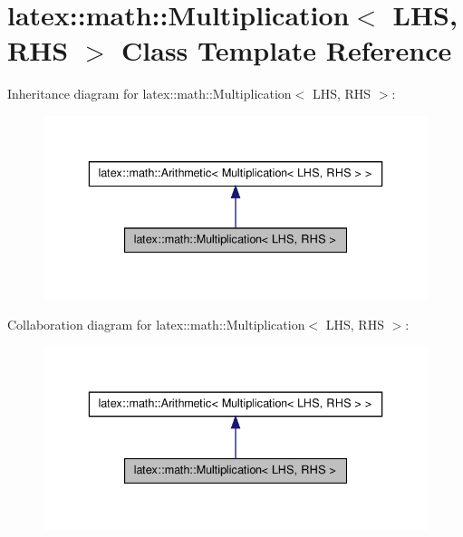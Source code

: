 \hypertarget{classlatex_1_1math_1_1Multiplication}{\section{latex\-:\-:math\-:\-:\-Multiplication$<$ \-L\-H\-S, \-R\-H\-S $>$ \-Class \-Template \-Reference}
\label{classlatex_1_1math_1_1Multiplication}
}


\-Inheritance diagram for latex\-:\-:math\-:\-:\-Multiplication$<$ \-L\-H\-S, \-R\-H\-S $>$\-:
\nopagebreak
\begin{figure}[H]
\begin{center}
\leavevmode
\includegraphics[width=336pt]{classlatex_1_1math_1_1Multiplication__inherit__graph}
\end{center}
\end{figure}


\-Collaboration diagram for latex\-:\-:math\-:\-:\-Multiplication$<$ \-L\-H\-S, \-R\-H\-S $>$\-:
\nopagebreak
\begin{figure}[H]
\begin{center}
\leavevmode
\includegraphics[width=336pt]{classlatex_1_1math_1_1Multiplication__coll__graph}
\end{center}
\end{figure}
